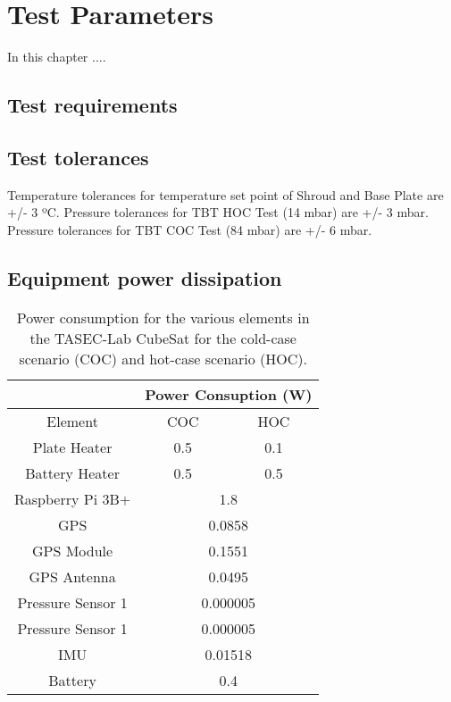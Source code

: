 \section{Test Parameters}\label{sec:Test_Parameters}
In this chapter ....

\subsection{Test requirements}

\subsection{Test tolerances}
Temperature tolerances for temperature set point of Shroud and Base Plate are +/- 3 ºC.
Pressure tolerances for TBT HOC Test (14 mbar) are +/- 3 mbar.
Pressure tolerances for TBT COC Test (84 mbar) are +/- 6 mbar.


\subsection{Equipment power dissipation}

\begin{table}[H]
\centering
\caption{Power consumption for the various elements in the TASEC-Lab CubeSat for the cold-case scenario (COC) and hot-case scenario (HOC).}
\label{tab:TPa-Power-budget}
\begin{tabular}{ccc} \hline
                  & \multicolumn{2}{c}{Power Consuption (W)} \\ \hline \hline
Element           & COC                 & HOC                \\
Plate Heater      & 0.5                 & 0.1                \\
Battery Heater    & 0.5                 & 0.5                \\
Raspberry Pi 3B+  & \multicolumn{2}{c}{1.8}                  \\
GPS               & \multicolumn{2}{c}{0.0858}               \\
GPS Module        & \multicolumn{2}{c}{0.1551}               \\
GPS Antenna       & \multicolumn{2}{c}{0.0495}               \\
Pressure Sensor 1 & \multicolumn{2}{c}{0.000005}             \\
Pressure Sensor 1 & \multicolumn{2}{c}{0.000005}             \\
IMU               & \multicolumn{2}{c}{0.01518}              \\
Battery           & \multicolumn{2}{c}{0.4}                 \\ \hline
\end{tabular}
\end{table}

